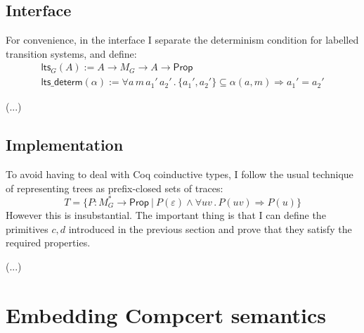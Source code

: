 \documentclass{article}
\newcommand{\kw}[1]{{\mathsf{#1}}}
\begin{document}
\subsection{Interface}

For convenience,
in the interface I separate the determinism condition
for labelled transition systems, and define:
\begin{gather*}
  \kw{lts}_G(A) :=
    A \rightarrow M_G \rightarrow A \rightarrow \kw{Prop} \\
  \kw{lts\_determ}(\alpha) :=
    \forall a \, m \, a_1' \, a_2' \,.\,
      \{ a_1', a_2' \} \subseteq \alpha(a, m) \Rightarrow
      a_1' = a_2'
\end{gather*}

(...)

\subsection{Implementation}

To avoid having to deal with Coq coinductive types,
I follow the usual technique of representing trees as
prefix-closed sets of traces:
\[
  T = \{ P : M_G^* \rightarrow \kw{Prop} \ \vert\ 
    P(\varepsilon) \wedge
    \forall u v \,.\, P(u v) \Rightarrow P(u) \}
\]
However this is insubstantial.
The important thing is that I can define the primitives $c, d$
introduced in the previous section and prove that they
satisfy the required properties.

(...)


\section{Embedding Compcert semantics}
\end{document}
